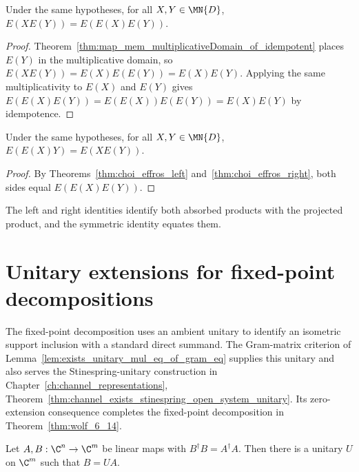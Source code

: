 \begin{theorem}
    \label{thm:choi_effros_right}
    \leanok
    Under the same hypotheses, for all $X,Y\in\MN{D}$,
    $E(XE(Y))=E(E(X)E(Y))$.
\end{theorem}

\begin{proof}\leanok
    Theorem~\ref{thm:map_mem_multiplicativeDomain_of_idempotent} places
    $E(Y)$ in the multiplicative domain, so
    $E(XE(Y))=E(X)E(E(Y))=E(X)E(Y)$.
    Applying the same multiplicativity to $E(X)$ and $E(Y)$ gives
    $E(E(X)E(Y))=E(E(X))E(E(Y))=E(X)E(Y)$ by idempotence.
\end{proof}

\begin{theorem}
    \label{thm:choi_effros_left_eq_right}
    \leanok
    Under the same hypotheses, for all $X,Y\in\MN{D}$,
    $E(E(X)Y)=E(XE(Y))$.
\end{theorem}

\begin{proof}\leanok
    By Theorems~\ref{thm:choi_effros_left}
    and~\ref{thm:choi_effros_right}, both sides equal
    $E(E(X)E(Y))$.
\end{proof}

The left and right identities identify both absorbed products with the
projected product, and the symmetric identity equates them.

\section{Unitary extensions for fixed-point decompositions}

The fixed-point decomposition uses an ambient unitary to identify an isometric
support inclusion with a standard direct summand. The Gram-matrix criterion
of Lemma~\ref{lem:exists_unitary_mul_eq_of_gram_eq} supplies this unitary and
also serves the Stinespring-unitary construction in
Chapter~\ref{ch:channel_representations},
Theorem~\ref{thm:channel_exists_stinespring_open_system_unitary}. Its
zero-extension consequence completes the fixed-point decomposition in
Theorem~\ref{thm:wolf_6_14}.

\begin{lemma}
    \label{lem:exists_unitary_mul_eq_of_gram_eq}
    \leanok
    \uses{}
    Let $A,B:\C^n\to\C^m$ be linear maps with
    $B^\dagger B=A^\dagger A$. Then there is a unitary
    $U$ on $\C^m$ such that $B=UA$.
\end{lemma}


